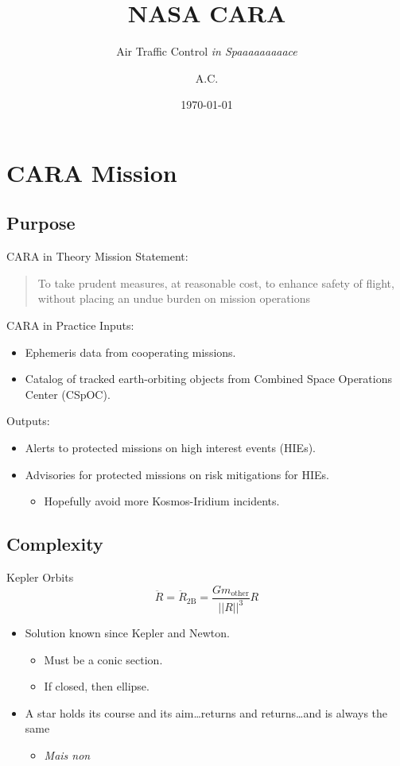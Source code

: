 \documentclass[pdf]{beamer}
\title{NASA CARA}
\subtitle{Air Traffic Control \emph{in Spaaaaaaaaace}}
\author{A.C.}
\date{\today}
\begin{document}
\begin{frame}
  \titlepage
\end{frame}

\section{CARA Mission}
\subsection{Purpose}
\begin{frame}{CARA in Theory}
  Mission Statement:
  \begin{quote}
    To take prudent measures, at reasonable cost, to enhance safety of flight,
    without placing an undue burden on mission operations
  \end{quote}
\end{frame}

\begin{frame}{CARA in Practice}
  Inputs:
  \begin{itemize}
  \item Ephemeris data from cooperating missions.
  \item Catalog of tracked earth-orbiting objects from Combined Space Operations
    Center (CSpOC).
  \end{itemize}

  Outputs:
  \begin{itemize}
  \item Alerts to protected missions on high interest events (HIEs).
  \item Advisories for protected missions on risk mitigations for HIEs.
    \begin{itemize}
    \item Hopefully avoid more Kosmos-Iridium incidents.
    \end{itemize}
  \end{itemize}
\end{frame}

\subsection{Complexity}
\begin{frame}{Kepler Orbits}
  \[ \ddot{R} = \ddot{R}_\text{2B} = \frac{Gm_\text{other}}{||R||^3}R \]

  \begin{itemize}
  \item Solution known since Kepler and Newton.
    \begin{itemize}
    \item Must be a conic section.
    \item If closed, then ellipse.
    \end{itemize}
  \item A star holds its course and its aim\ldots returns and returns\ldots and is always the same
    \begin{itemize}
    \item \textit{Mais non}
    \end{itemize}
  \end{itemize}
\end{frame}
\end{document}
